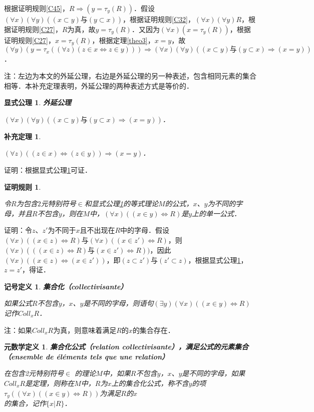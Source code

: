\documentclass[12pt, a4paper, oneside]{book}
\newtheorem{metadef}{元数学定义}
\newtheorem{sign}{记号定义}
\newtheorem{C}{证明规则}
\newtheorem{ex}{显式公理}
\newtheorem{cor}{补充定理}
\begin{document}
			\par
			根据证明规则\ref{C45}，$R\Rightarrow (y=\tau_y(R))$．假设$(\forall x)(\forall y)((x\subset y)\text{与}(y\subset x))$，根据证明规则\ref{C32}，$(\forall x)(\forall y)R$，根据证明规则\ref{C27}，$R$为真，故$y=\tau_y(R)$．又因为$(\forall x)(x=\tau_y(R))$，根据证明规则\ref{C27}，$x=\tau_y(R)$，根据定理\ref{theo3}，$x=y$，故$(\forall y)(y=\tau_x((\forall z)(z\in x\Leftrightarrow z\in y)))\Rightarrow (\forall x)(\forall y)((x\subset y)\text{与}(y\subset x)\Rightarrow (x=y))$．
			\par
			注：左边为本文的外延公理，右边是外延公理的另一种表述，包含相同元素的集合相等．本补充定理表明，外延公理的两种表述方式是等价的．

			\begin{ex}\label{ex1}
				\textbf{外延公理}
				\par
				$(\forall x)(\forall y)((x\subset y)\text{与}(y\subset x)\Rightarrow(x=y))$．
			\end{ex}

			\begin{cor}\label{cor2}
				\hfill\par
				$(\forall z)((z\in x)\Leftrightarrow(z\in y))\Rightarrow(x=y)$．
			\end{cor}
			证明：根据显式公理\ref{ex1}可证．

			\begin{C}\label{C48}
				\hfill\par
				令$R$为包含$2$元特别符号$\in$和显式公理\ref{ex1}的等式理论$M$的公式，$x$、$y$为不同的字母，并且$R$不包含$y$，则在$M$中，$(\forall x)((x\in y)\Leftrightarrow R)$是$y$上的单一公式．
			\end{C}
			证明：令$z$、$z'$为不同于$x$且不出现在$R$中的字母．假设$(\forall x)((x\in z)\Leftrightarrow R)\text{与}(\forall x)((x\in z')\Leftrightarrow R)$，则$(\forall x)(((x\in z)\Leftrightarrow R)\text{与}(x\in z')\Leftrightarrow R))$，因此$(\forall x)((x\in z)\Leftrightarrow (x\in z'))$，即$(z\subset z')\text{与}(z'\subset z)$，根据显式公理\ref{ex1}，$z=z'$，得证．

			\begin{sign}
				\textbf{集合化（collectivisante）}
				\par
				如果公式$R$不包含$y$，$x$、$y$是不同的字母，则语句$(\exists y)(\forall x)((x\in y)\Leftrightarrow R)$记作$Coll_xR$．
			\end{sign}
			注：如果$Coll_xR$为真，则意味着满足$R$的$x$的集合存在．

			\begin{metadef}
				\textbf{集合化公式（relation collectivisante），满足公式的元素集合\\（ensemble de éléments tels que une relation）}
				\par
				在包含2元特别符号$\in$ 的理论$M$中，如果$R$不包含$y$，$x$、$y$是不同的字母，如果$Coll_xR$是定理，则称在$M$中，$R$为$x$上的集合化公式，称不含$y$的项$\tau_y ((\forall x)((x\in y)\Leftrightarrow R))$为满足$R$的$x$\\的集合，记作$\{x|R\}$．
			\end{metadef}
\end{document}
